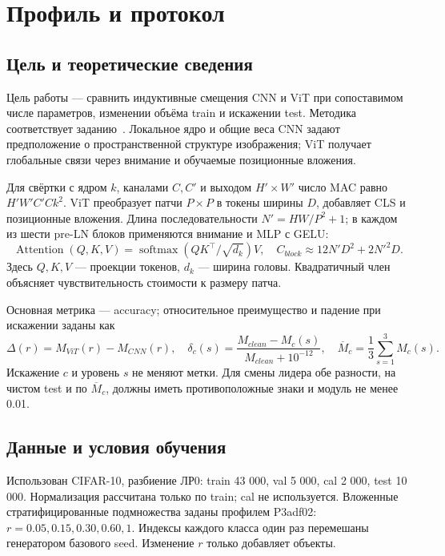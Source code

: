 \section{Профиль и протокол}
\subsection{Цель и теоретические сведения}
Цель работы --- сравнить индуктивные смещения CNN и ViT при сопоставимом числе параметров, изменении объёма train и искажении test. Методика соответствует заданию~\cite{teacher}. Локальное ядро и общие веса CNN задают предположение о пространственной структуре изображения; ViT получает глобальные связи через внимание и обучаемые позиционные вложения.

Для свёртки с ядром $k$, каналами $C,C'$ и выходом $H'\times W'$ число MAC равно $H'W'C'Ck^2$. ViT преобразует патчи $P\times P$ в токены ширины $D$, добавляет CLS и позиционные вложения. Длина последовательности $N'=HW/P^2+1$; в каждом из шести pre-LN блоков применяются внимание и MLP с GELU:
\begin{equation}\operatorname{Attention}(Q,K,V)=\operatorname{softmax}(QK^\top/\sqrt{d_k})V,\quad
C_{block}\approx12N'D^2+2N'^2D.\end{equation}
Здесь $Q,K,V$ --- проекции токенов, $d_k$ --- ширина головы. Квадратичный член объясняет чувствительность стоимости к размеру патча.

Основная метрика --- accuracy; относительное преимущество и падение при искажении заданы как
\begin{equation}\Delta(r)=M_{ViT}(r)-M_{CNN}(r),\quad
\delta_c(s)=\frac{M_{clean}-M_c(s)}{M_{clean}+10^{-12}},\quad
\overline M_c=\frac13\sum_{s=1}^3M_c(s).\end{equation}
Искажение $c$ и уровень $s$ не меняют метки. Для смены лидера обе разности, на чистом test и по $\overline M_c$, должны иметь противоположные знаки и модуль не менее 0.01.

\subsection{Данные и условия обучения}
Использован CIFAR-10, разбиение ЛР0: train 43 000, val 5 000, cal 2 000, test 10 000. Нормализация рассчитана только по train; cal не используется. Вложенные стратифицированные подмножества заданы профилем P3adf02: $r=0.05,0.15,0.30,0.60,1$. Индексы каждого класса один раз перемешаны генератором базового seed. Изменение $r$ только добавляет объекты.

